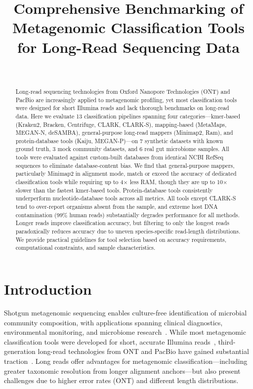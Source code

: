 \documentclass[11pt]{article}
\title{Comprehensive Benchmarking of Metagenomic Classification Tools for Long-Read Sequencing Data}
\author{~}
\date{}
\begin{document}
\maketitle

\begin{abstract}
Long-read sequencing technologies from Oxford Nanopore Technologies (ONT) and PacBio are increasingly applied to metagenomic profiling, yet most classification tools were designed for short Illumina reads and lack thorough benchmarks on long-read data.  Here we evaluate 13 classification pipelines spanning four categories---kmer-based (Kraken2, Bracken, Centrifuge, CLARK, CLARK-S), mapping-based (MetaMaps, MEGAN-N, deSAMBA), general-purpose long-read mappers (Minimap2, Ram), and protein-database tools (Kaiju, MEGAN-P)---on 7 synthetic datasets with known ground truth, 3 mock community datasets, and 6 real gut microbiome samples.  All tools were evaluated against custom-built databases from identical NCBI RefSeq sequences to eliminate database-content bias.  We find that general-purpose mappers, particularly Minimap2 in alignment mode, match or exceed the accuracy of dedicated classification tools while requiring up to 4$\times$ less RAM, though they are up to 10$\times$ slower than the fastest kmer-based tools.  Protein-database tools consistently underperform nucleotide-database tools across all metrics.  All tools except CLARK-S tend to over-report organisms absent from the sample, and extreme host DNA contamination (99\% human reads) substantially degrades performance for all methods.  Longer reads improve classification accuracy, but filtering to only the longest reads paradoxically reduces accuracy due to uneven species-specific read-length distributions.  We provide practical guidelines for tool selection based on accuracy requirements, computational constraints, and sample characteristics.
\end{abstract}

\section{Introduction}

Shotgun metagenomic sequencing enables culture-free identification of microbial community composition, with applications spanning clinical diagnostics, environmental monitoring, and microbiome research~\citep{quince2017shotgun}.  While most metagenomic classification tools were developed for short, accurate Illumina reads~\citep{breitwieser2019review}, third-generation long-read technologies from ONT and PacBio have gained substantial traction~\citep{loman2015complete,jain2018nanopore,wenger2019hifi}.  Long reads offer advantages for metagenomic classification---including greater taxonomic resolution from longer alignment anchors---but also present challenges due to higher error rates (ONT) and different length distributions.
\end{document}
